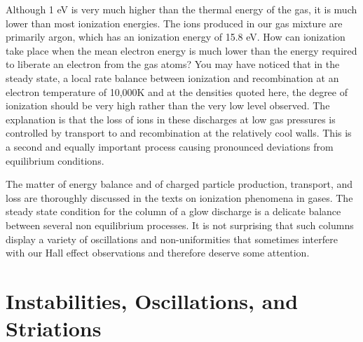 \documentclass{../lab}
\begin{document}
Although 1 eV is very much higher than the thermal energy of the gas, it is much lower than most ionization energies. The ions produced in our gas mixture are primarily argon, which has an ionization energy of 15.8 eV. How can ionization take place when the mean electron energy is much lower than the energy required to liberate an electron from the gas atoms? You may have noticed that in the steady state, a local rate balance between ionization and recombination at an electron temperature of 10,000K and at the densities quoted here, the degree of ionization should be very high rather than the very low level observed. The explanation is that the loss of ions in these discharges at low gas pressures is controlled by transport to and recombination at the relatively cool walls. This is a second and equally important process causing pronounced deviations from equilibrium conditions.

The matter of energy balance and of charged particle production, transport, and loss are thoroughly discussed in the texts on ionization phenomena in gases. The steady state condition for the column of a glow discharge is a delicate balance between several non equilibrium processes. It is not surprising that such columns display a variety of oscillations and non-uniformities that sometimes interfere with our Hall effect observations and therefore deserve some attention.



\section{Instabilities, Oscillations, and Striations}
\end{document}
